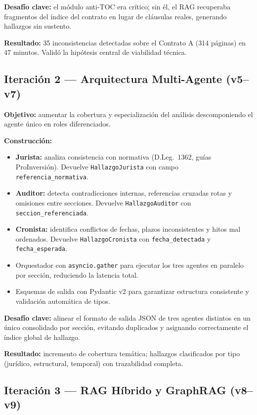 \textbf{Desafío clave:} el módulo anti-TOC era crítico; sin él, el RAG
recuperaba fragmentos del índice del contrato en lugar de cláusulas reales,
generando hallazgos sin sustento.

\textbf{Resultado:} 35 inconsistencias detectadas sobre el Contrato A
(314 páginas) en 47 minutos. Validó la hipótesis central de viabilidad técnica.

\subsection{Iteración 2 — Arquitectura Multi-Agente (v5--v7)}

\textbf{Objetivo:} aumentar la cobertura y especialización del análisis
descomponiendo el agente único en roles diferenciados.

\textbf{Construcción:}
\begin{itemize}
    \item \textbf{Jurista:} analiza consistencia con normativa (D.Leg.\ 1362,
    guías ProInversión). Devuelve \texttt{HallazgoJurista} con campo
    \texttt{referencia\_normativa}.
    \item \textbf{Auditor:} detecta contradicciones internas, referencias
    cruzadas rotas y omisiones entre secciones. Devuelve
    \texttt{HallazgoAuditor} con \texttt{seccion\_referenciada}.
    \item \textbf{Cronista:} identifica conflictos de fechas, plazos
    inconsistentes y hitos mal ordenados. Devuelve \texttt{HallazgoCronista}
    con \texttt{fecha\_detectada} y \texttt{fecha\_esperada}.
    \item Orquestador con \texttt{asyncio.gather} para ejecutar los tres
    agentes en paralelo por sección, reduciendo la latencia total.
    \item Esquemas de salida con Pydantic v2 para garantizar estructura
    consistente y validación automática de tipos.
\end{itemize}

\textbf{Desafío clave:} alinear el formato de salida JSON de tres agentes
distintos en un único consolidado por sección, evitando duplicados y
asignando correctamente el índice global de hallazgo.

\textbf{Resultado:} incremento de cobertura temática; hallazgos clasificados
por tipo (jurídico, estructural, temporal) con trazabilidad completa.

\subsection{Iteración 3 — RAG Híbrido y GraphRAG (v8--v9)}

